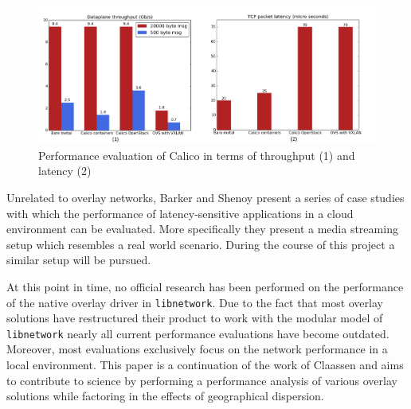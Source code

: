 \begin{figure}[!ht]	
	\centering
	\includegraphics[scale=0.28]{img/calico_perf.png}
	\caption {Performance evaluation of Calico in terms of throughput (1) and latency (2)}
	\label{fig:calico_perf}
\end{figure}

Unrelated to overlay networks, Barker and Shenoy \cite{barker2010empirical} present a series of case studies with which the performance of latency-sensitive applications in a cloud environment can be evaluated. More specifically they present a media streaming setup which resembles a real world scenario. During the course of this project a similar setup will be pursued.

At this point in time, no official research has been performed on the performance of the native overlay driver in \texttt{libnetwork}. Due to the fact that most overlay solutions have restructured their product to work with the modular model of \texttt{libnetwork} nearly all current performance evaluations have become outdated. Moreover, most evaluations exclusively focus on the network performance in a local environment. This paper is a continuation of the work of Claassen and aims to contribute to science by performing a performance analysis of various overlay solutions while factoring in the effects of geographical dispersion. 

